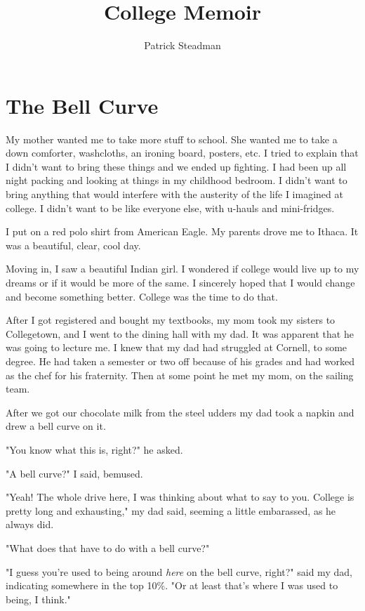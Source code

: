 \documentclass[12pt]{article}
\title{College Memoir}
\author{Patrick Steadman}
\begin{document}
\maketitle


\section{The Bell Curve}

My mother wanted me to take more stuff to school.  She wanted me to take a down
comforter, washcloths, an ironing board, posters, etc.   I tried to explain that
I didn't want to bring these things and we ended up fighting.  I had been up all
night packing and looking at things in my childhood bedroom.  I didn't want to
bring anything that would interfere with the austerity of the life I imagined at
college.  I didn't want to be like everyone else, with u-hauls and mini-fridges.

I put on a red polo shirt from American Eagle.  My parents drove me to Ithaca.
It was a beautiful, clear, cool day.  

Moving in, I saw a beautiful Indian girl.  I wondered if college would live up
to my dreams or if it would be more of the same.  I sincerely hoped that I would
change and become something better.  College was the time to do that.

After I got registered and bought my textbooks, my mom took my sisters to
Collegetown, and I went to the dining hall with my dad.  It was apparent that he
was going to lecture me.  I knew that my dad had struggled at Cornell,  to some
degree.  He had taken a semester or two off because of his grades and had worked
as the chef for his fraternity.  Then at some point he met my mom, on the
sailing team.  

After we got our chocolate milk from the steel udders my dad took a napkin and
drew a bell curve on it.

"You know what this is, right?" he asked.

"A bell curve?" I said, bemused.

"Yeah!  The whole drive here, I was thinking about what to say to you.  College
is pretty long and exhausting," my dad said, seeming a little embarassed, as
he always did.

"What does that have to do with a bell curve?"

"I guess you're used to being around \textit{here} on the bell curve, right?"
said my dad, indicating somewhere in the top 10\%.  "Or at least that's where I
was used to being, I think."  
\end{document}
